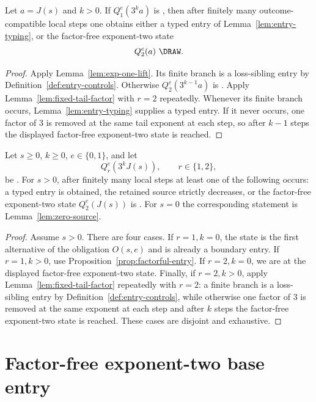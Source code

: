 \begin{proposition}\label{prop:factorful-entry}
Let $a=J(s)$ and $k>0$. If $Q_1^e(3^ka)$ is \DRAW, then after finitely many
outcome-compatible local steps one obtains either a typed entry of
Lemma~\ref{lem:entry-typing}, or the factor-free exponent-two state
\[
  Q_2^e(a)\text{ \DRAW}.
\]
\end{proposition}

\begin{proof}
Apply Lemma~\ref{lem:exp-one-lift}. Its finite branch is a loss-sibling entry by Definition~\ref{def:entry-controls}. Otherwise $Q_2^e(3^{k-1}a)$ is \DRAW. Apply
Lemma~\ref{lem:fixed-tail-factor} with $r=2$ repeatedly. Whenever its finite
branch occurs, Lemma~\ref{lem:entry-typing} supplies a typed entry. If it never
occurs, one factor of $3$ is removed at the same tail exponent at each step,
so after $k-1$ steps the displayed factor-free exponent-two state is reached.
\end{proof}

\begin{proposition}\label{prop:boundary-reduction}
Let $s\ge0$, $k\ge0$, $e\in\{0,1\}$, and let
\[
  Q_r^e(3^kJ(s)),\qquad r\in\{1,2\},
\]
be \DRAW. For $s>0$, after finitely many local steps at least one of the following occurs: a typed entry is obtained, the retained source strictly
decreases, or the factor-free exponent-two state $Q_2^e(J(s))$ is \DRAW.
For $s=0$ the corresponding statement is Lemma~\ref{lem:zero-source}.
\end{proposition}

\begin{proof}
Assume $s>0$. There are four cases. If $r=1,k=0$, the state is the first
alternative of the obligation $O(s,e)$ and is already a boundary entry. If
$r=1,k>0$, use Proposition~\ref{prop:factorful-entry}. If $r=2,k=0$, we are
at the displayed factor-free exponent-two state. Finally, if $r=2,k>0$, apply
Lemma~\ref{lem:fixed-tail-factor} repeatedly with $r=2$: a finite branch is a
loss-sibling entry by Definition~\ref{def:entry-controls}, while otherwise
one factor of $3$ is removed at the same exponent at each step and after $k$
steps the factor-free exponent-two state is reached. These cases are disjoint
and exhaustive.
\end{proof}

\section{Factor-free exponent-two base entry}


